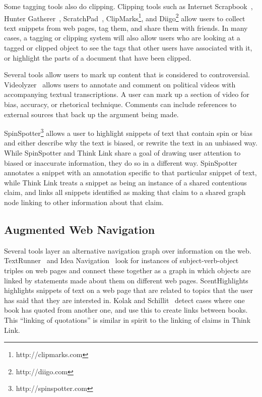 \documentclass{chi2009}
\begin{document}
Some tagging tools also do clipping. Clipping tools such as Internet Scrapbook~\cite{Sugiura19998}, Hunter Gatherer~\cite{2002}, ScratchPad~\cite{Gotz2007}, ClipMarks\footnote{http://clipmarks.com}, and Diigo\footnote{http://diigo.com} allow users to collect text snippets from web pages, tag them, and share them with friends. In many cases, a tagging or clipping system will also allow users who are looking at a tagged or clipped object to see the tags that other users have associated with it, or highlight the parts of a document that have been clipped.

Several tools allow users to mark up content that is considered to controversial. Videolyzer~\cite{Diakopoulos2008} allows users to annotate and comment on political videos with accompanying textual transcriptions. A user can mark up a section of video for bias, accuracy, or rhetorical technique. Comments can include references to external sources that back up the argument being made. 

SpinSpotter\footnote{http://spinspotter.com} allows a user to highlight snippets of text that contain spin or bias and either describe why the text is biased, or rewrite the text in an unbiased way. While SpinSpotter and Think Link share a goal of drawing user attention to biased or inaccurate information, they do so in a different way. SpinSpotter annotates a snippet with an annotation specific to that particular snippet of text, while Think Link treats a snippet as being an instance of a shared contentious claim, and links all snippets identified as making that claim to a shared graph node linking to other information about that claim.

\subsection{Augmented Web Navigation}

Several tools layer an alternative navigation graph over information on the web. TextRunner~\cite{Etzioni2008} and Idea Navigation~\cite{Etzioni2008} look for instances of subject-verb-object triples on web pages and connect these together as a graph in which objects are linked by statements made about them on different web pages. ScentHighlights~\cite{Chi2005a} highlights snippets of text on a web page that are related to topics that the user has said that they are intersted in. Kolak and Schillit~\cite{Kolak2008} detect cases where one book has quoted from another one, and use this to create links between books. This ``linking of quotations'' is similar in spirit to the linking of claims in Think Link. 
\end{document}
